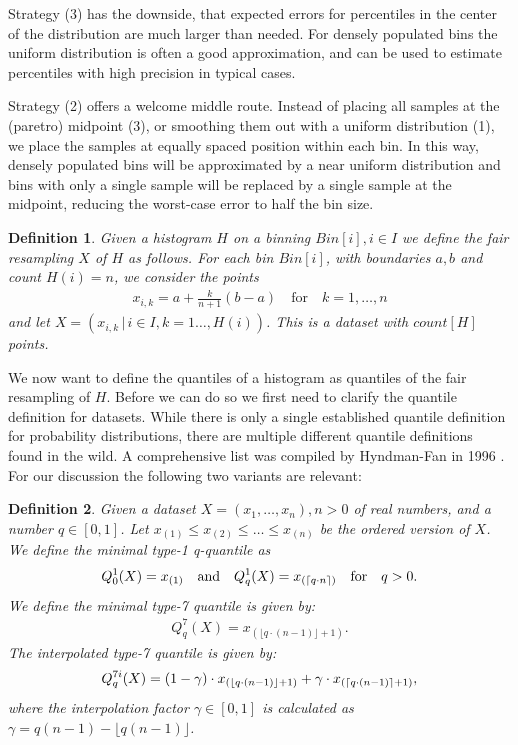 \documentclass{article}
\DeclarePairedDelimiter{\ceil}{\lceil}{\rceil}
\theoremstyle{plain}
\newtheorem{definition}{Definition}[section]
\theoremstyle{remark}
\newcommand{\qtext}[1]{\quad\text{#1}\quad} %
\newcommand{\floor}[1]{\lfloor#1\rfloor}
\begin{document}
Strategy (3) has the downside, that expected errors for percentiles in the center of the distribution
are much larger than needed. For densely populated bins the uniform distribution is often a good
approximation, and can be used to estimate percentiles with high precision in typical cases.

Strategy (2) offers a welcome middle route. Instead of placing all samples at the (paretro) midpoint (3),
or smoothing them out with a uniform distribution (1), we place the samples at equally spaced position
within each bin. In this way, densely populated bins will be approximated by a near uniform distribution
and bins with only a single sample will be replaced by a single sample at the midpoint, reducing
the worst-case error to half the bin size.

\begin{definition}
  Given a histogram $H$ on a binning $Bin[i], i \in I$ we define the fair resampling $X$ of $H$ as follows.
  For each bin $Bin[i]$, with boundaries $a,b$ and count $H(i)=n$, we consider the points
  \begin{align*}
    x_{i,k} = a + \frac{k}{n+1} (b-a) \qtext{for} k=1,\dots,n
  \end{align*}
  and let $X = (x_{i,k} \,|\, i \in I, k = 1\dots,H(i))$. This is a dataset with $count[H]$ points.
\end{definition}

We now want to define the quantiles of a histogram as quantiles of the fair resampling of $H$.
Before we can do so we first need to clarify the quantile definition for datasets.
While there is only a single established quantile definition for probability distributions,
there are multiple different quantile definitions found in the wild.
A comprehensive list was compiled by Hyndman-Fan in 1996 \cite{HF1996}.
For our discussion the following two variants are relevant:

\begin{definition}
  Given a dataset $X=(x_1,\dots,x_n), n>0$ of real numbers, and a number $q \in [0,1]$.
  Let $x_{(1)} \leq x_{(2)} \leq \dots \leq x_{(n)}$ be the ordered version of $X$.
  We define the minimal type-1 q-quantile as
  \begin{align*}
    Q^1_0(X) = x_{(1)} \qtext{and}  Q^1_q(X) = x_{(\ceil{q \cdot n})} \qtext{for} q > 0.
  \end{align*}
  We define the minimal type-7 quantile is given by:
  \begin{align*}
    Q^{7}_q(X) = x_{(\floor{q \cdot (n - 1)} + 1)}.
  \end{align*}
  The interpolated type-7 quantile is given by:
  \begin{align*}
    Q^{7i}_q(X) = (1 - \gamma) \cdot x_{(\floor{q \cdot (n - 1)} + 1)} + \gamma \cdot x_{(\ceil{q \cdot (n - 1)} + 1)},
  \end{align*}
  where the interpolation factor $\gamma \in [0,1]$ is calculated as $\gamma = q(n-1) - \floor{q(n-1)}$.
\end{definition}
\end{document}
